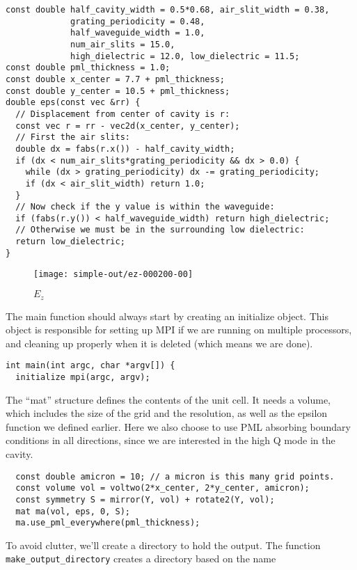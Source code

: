 \begin{verbatim}
const double half_cavity_width = 0.5*0.68, air_slit_width = 0.38,
             grating_periodicity = 0.48,
             half_waveguide_width = 1.0,
             num_air_slits = 15.0,
             high_dielectric = 12.0, low_dielectric = 11.5;
const double pml_thickness = 1.0;
const double x_center = 7.7 + pml_thickness;
const double y_center = 10.5 + pml_thickness;
double eps(const vec &rr) {
  // Displacement from center of cavity is r:
  const vec r = rr - vec2d(x_center, y_center);
  // First the air slits:
  double dx = fabs(r.x()) - half_cavity_width;
  if (dx < num_air_slits*grating_periodicity && dx > 0.0) {
    while (dx > grating_periodicity) dx -= grating_periodicity;
    if (dx < air_slit_width) return 1.0;
  }
  // Now check if the y value is within the waveguide:
  if (fabs(r.y()) < half_waveguide_width) return high_dielectric;
  // Otherwise we must be in the surrounding low dielectric:
  return low_dielectric;
}
\end{verbatim}
\begin{figure}
\label{simple_figure}
\caption{$E_z$}
\begin{center}
\texttt{[image: simple-out/ez-000200-00]}
\end{center}
\end{figure}
The main function should always start by creating an initialize object.
This object is responsible for setting up MPI if we are running on multiple
processors, and cleaning up properly when it is deleted (which means we are
done).
\begin{verbatim}
int main(int argc, char *argv[]) {
  initialize mpi(argc, argv);
\end{verbatim}
The ``mat'' structure defines the contents of the unit cell.  It needs a
volume, which includes the size of the grid and the resolution, as well as
the epsilon function we defined earlier.  Here we also choose to use PML
absorbing boundary conditions in all directions, since we are interested in
the high Q mode in the cavity.
\begin{verbatim}
  const double amicron = 10; // a micron is this many grid points.
  const volume vol = voltwo(2*x_center, 2*y_center, amicron);
  const symmetry S = mirror(Y, vol) + rotate2(Y, vol);
  mat ma(vol, eps, 0, S);
  ma.use_pml_everywhere(pml_thickness);
\end{verbatim}
To avoid clutter, we'll create a directory to hold the output.  The
function \verb!make_output_directory! creates a directory based on the name
